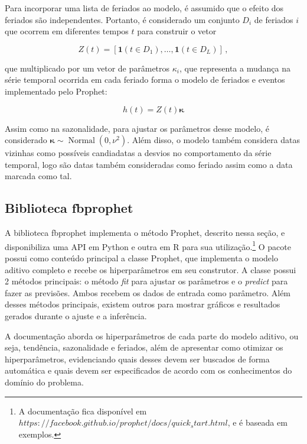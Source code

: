 Para incorporar uma lista de feriados ao modelo, é assumido que o efeito dos feriados são independentes. Portanto, é considerado um conjunto $D_{i}$ de feriados $i$ que ocorrem em diferentes tempos $t$ para construir o vetor

\begin{equation}
    Z(t)=\left[\mathbf{1}\left(t \in D_{1}\right), \ldots, \mathbf{1}\left(t \in D_{L}\right)\right] \, ,
\end{equation}

que multiplicado por um vetor de parâmetros $\kappa_{i}$, que representa a mudança na série temporal ocorrida em cada feriado forma o modelo de feriados e eventos implementado pelo Prophet:

\begin{equation}
    h(t)=Z(t) \boldsymbol{\kappa}
\end{equation}

Assim como na sazonalidade, para ajustar os parâmetros desse modelo, é considerado $\boldsymbol{\kappa} \sim \operatorname{Normal}\left(0, \nu^{2}\right) .$ Além disso, o modelo também considera datas vizinhas como possíveis candiadatas a desvios no comportamento da série temporal, logo são datas também consideradas como feriado assim como a data marcada como tal.

\subsection{Biblioteca fbprophet}
A biblioteca fbprophet implementa o método Prophet, descrito nessa seção, e disponibiliza uma API em Python e outra em R para sua utilização.\footnote{A documentação fica disponível em $https://facebook.github.io/prophet/docs/quick_start.html$, e é baseada em exemplos.} O pacote possui como conteúdo principal a classe Prophet, que implementa o modelo aditivo completo e recebe os hiperparâmetros em seu construtor. A classe possui 2 métodos principais: o método \textit{fit} para ajustar os parâmetros e o \textit{predict} para fazer as previsões. Ambos recebem os dados de entrada como parâmetro. Além desses métodos principais, existem outros para mostrar gráficos e resultados gerados durante o ajuste e a inferência.

A documentação aborda os hiperparâmetros de cada parte do modelo aditivo, ou seja, tendência, sazonalidade e feriados, além de apresentar como otimizar os hiperparâmetros, evidenciando quais desses devem ser buscados de forma automática e quais devem ser especificados de acordo com os conhecimentos do domínio do problema.

